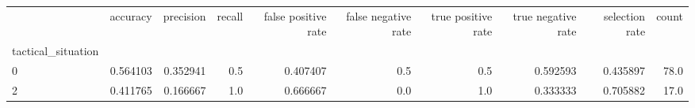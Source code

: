 \begin{tabular}{lrrrrrrrrr}
\toprule
{} &  accuracy &  precision &  recall &  false positive rate &  false negative rate &  true positive rate &  true negative rate &  selection rate &  count \\
tactical\_situation &           &            &         &                      &                      &                     &                     &                 &        \\
\midrule
0                  &  0.564103 &   0.352941 &     0.5 &             0.407407 &                  0.5 &                 0.5 &            0.592593 &        0.435897 &   78.0 \\
2                  &  0.411765 &   0.166667 &     1.0 &             0.666667 &                  0.0 &                 1.0 &            0.333333 &        0.705882 &   17.0 \\
\bottomrule
\end{tabular}
